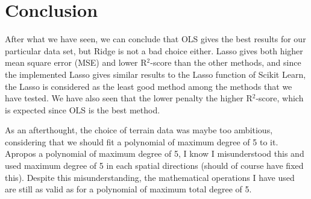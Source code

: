 \section{Conclusion} \label{sec:conclusion}
After what we have seen, we can conclude that OLS gives the best results for our particular data set, but Ridge is not a bad choice either. Lasso gives both higher mean square error (MSE) and lower R$^2$-score than the other methods, and since the implemented Lasso gives similar results to the Lasso function of Scikit Learn, the Lasso is considered as the least good method among the methods that we have tested. We have also seen that the lower penalty the higher R$^2$-score, which is expected since OLS is the best method. 

As an afterthought, the choice of terrain data was maybe too ambitious, considering that we should fit a polynomial of maximum degree of 5 to it.  Apropos a polynomial of maximum degree of 5, I know I misunderstood this and used maximum degree of 5 in each spatial directions (should of course have fixed this). Despite this misunderstanding, the mathematical operations I have used are still as valid as for a polynomial of maximum total degree of 5.